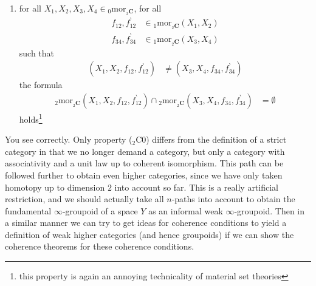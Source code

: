 \begin{enumerate}
\begin{align*}
  \\
  {}_{2}f_{\beta}
  &\in
  {}_{2}\mathrm{mor}_{{}_{2}\mathbf{C}}(X_{2},X_{1},f_{21},f_{21}^{\backprime})
\end{align*}
with $X_{2} \in {}_{0}\mathrm{mor}_{{}_{2}\mathbf{C}}$ both
\begin{align*}
  \circ_{{}_{2}\mathbf{C}}^{\textrm{h}}
  (X_{1},X_{1},X_{2})
  (\mathrm{id}_{\mathrm{id}_{X_{1}}},{}_{2}f_{\alpha})
  &=
  {}_{2}f_{\alpha}
\end{align*}
and
\begin{align*}
  \circ_{{}_{2}\mathbf{C}}^{\textrm{h}}
  (X_{2},X_{1},X_{1})
  ({}_{2}f_{\beta},\mathrm{id}_{\mathrm{id}_{X_{1}}})
  &=
  {}_{2}f_{\beta}
\end{align*}
\item[(${}_{2}$C3)]
for all $X_{1},X_{2},X_{3},X_{4} \in {}_{0}\mathrm{mor}_{{}_{2}\mathbf{C}}$, for all
\begin{align*}
  f_{12},f_{12}^{\backprime}
  &\in
  {}_{1}\mathrm{mor}_{{}_{2}\mathbf{C}}(X_{1},X_{2})
  \\
  f_{34},f_{34}^{\backprime}
  &\in
  {}_{1}\mathrm{mor}_{{}_{2}\mathbf{C}}(X_{3},X_{4})
\end{align*}
such that
\begin{align*}
  (X_{1},X_{2},f_{12},f_{12}^{\backprime})
  &\neq
  (X_{3},X_{4},f_{34},f_{34}^{\backprime})
\end{align*}
the formula
\begin{align*}
  {}_{2}\mathrm{mor}_{{}_{2}\mathbf{C}}(X_{1},X_{2},f_{12},f_{12}^{\backprime})
  \cap
  {}_{2}\mathrm{mor}_{{}_{2}\mathbf{C}}(X_{3},X_{4},f_{34},f_{34}^{\backprime})
  &=
  \emptyset
\end{align*}
holds\footnote{this property is again an annoying technicality of material set theories}
\end{enumerate}
You see correctly.
Only property (${}_{2}$C0) differs from the definition of a strict category in that we no longer demand a category, but only a category with associativity and a unit law up to coherent isomorphism.
This path can be followed further to obtain even higher categories, since we have only taken homotopy up to dimension $2$ into account so far.
This is a really artificial restriction, and we should actually take all $n$-paths into account to obtain the fundamental $\infty$-groupoid of a space $Y$ as an informal weak $\infty$-groupoid.
Then in a similar manner we can try to get ideas for coherence conditions to yield a definition of weak higher categories (and hence groupoids) if we can show the coherence theorems for these coherence conditions.
